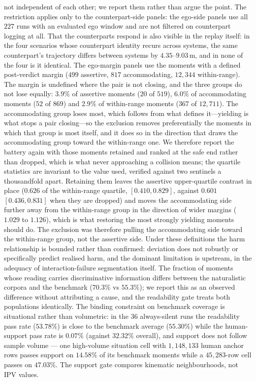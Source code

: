\documentclass[12pt,a4paper]{article}
\begin{document}
not independent of each other; we report them rather than argue the point. The restriction applies
only to the counterpart-side panels: the ego-side panels use all $227$ runs with an evaluated ego
window and are not filtered on counterpart logging at all. That the counterparts respond is also visible in the replay itself: in the four
scenarios whose counterpart identity recurs across systems, the same counterpart's trajectory
differs between systems by $4.35$--$9.03$\,m, and in none of the four is it identical. The ego-margin panels use the moments with
a defined post-verdict margin ($499$ assertive, $817$ accommodating, $12{,}344$ within-range). The
margin is undefined where the pair is not closing, and the three groups do not lose equally: $3.9\%$
of assertive moments ($20$ of $519$), $6.0\%$ of accommodating moments ($52$ of $869$) and $2.9\%$
of within-range moments ($367$ of $12{,}711$). The accommodating group loses most, which follows
from what defines it---yielding is what stops a pair closing---so the exclusion removes
preferentially the moments in which that group is most itself, and it does so in the direction that
draws the accommodating group toward the within-range one. We therefore report the battery again
with those moments retained and ranked at the safe end rather than dropped, which is what never
approaching a collision means; the quartile statistics are invariant to the value used, verified
against two sentinels a thousandfold apart. Retaining them leaves the assertive
upper-quartile contrast in place ($0.626$ of the within-range quartile, $[0.410, 0.829]$, against
$0.601$ $[0.436, 0.831]$ when they are dropped) and moves the accommodating side further away from
the within-range group in the direction of wider margins ($1.029$ to $1.126$), which is what
restoring the most strongly yielding moments should do. The exclusion was therefore pulling the
accommodating side toward the within-range group, not the assertive side. Under these definitions the harm
relationship is bounded rather than confirmed: deviation does not robustly or specifically predict
realised harm, and the dominant limitation is upstream, in the adequacy of interaction-failure
segmentation itself. The fraction of moments whose reading carries discriminative information
differs between the naturalistic corpora and the benchmark ($70.3\%$ vs $55.3\%$); we report this as
an observed difference without attributing a cause, and the readability gate treats both populations
identically. The binding constraint on benchmark coverage is situational rather than volumetric: in the 36 always-silent runs the readability pass rate ($53.78\%$) is close to the benchmark average ($55.30\%$) while the human-support pass rate is $0.07\%$ (against $32.32\%$ overall), and support does not follow sample volume --- one high-volume situation cell with $1{,}148{,}133$ human anchor rows passes support on $14.58\%$ of its benchmark moments while a $45{,}283$-row cell passes on $47.03\%$. The support gate compares kinematic neighbourhoods, not IPV values.
\end{document}
